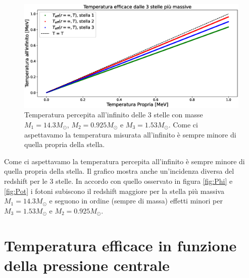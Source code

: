 \documentclass[a4paper, titlepage]{article}
\begin{document}
\begin{figure}[h]
    \centering
    \includegraphics[width = \textwidth]{Figures/Teff.eps}
    \caption{Temperatura percepita all'infinito delle 3 stelle con masse $M_1 = 14.3 M_\odot$, $M_2 = 0.925 M_\odot$ e $M_3 = 1.53 M_\odot$. Come ci aspettavamo la temperatura misurata all'infinito è sempre minore di quella propria della stella.}
    \label{fig:Teff}
\end{figure}

Come ci aspettavamo la temperatura percepita all'infinito è sempre minore di quella propria della stella.
Il grafico mostra anche un'incidenza diversa del redshift per le 3 stelle.
In accordo con quello osservato in figura \ref{fig:Phi} e \ref{fig:Pot} i fotoni subiscono il redshift maggiore per la stella più massiva $M_1 = 14.3 M_\odot$ e seguono in ordine (sempre di massa) effetti minori per $M_3 = 1.53 M_\odot$ e $M_2 = 0.925 M_\odot$.




\section{Temperatura efficace in funzione della pressione centrale}
\end{document}
